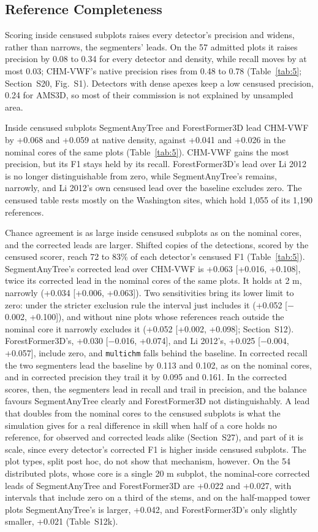 \documentclass[journal]{IEEEtran}
\begin{document}
\subsection{Reference Completeness}\label{sec:5.5}

Scoring inside censused subplots raises every detector's precision and widens,
rather than narrows, the segmenters' leads. On the 57 admitted plots it raises
precision by 0.08 to 0.34 for every detector and density, while recall moves by
at most 0.03; CHM-VWF's native precision rises from 0.48 to 0.78 (Table~\ref{tab:5};
Section~S20, Fig.~S1). Detectors with dense apexes keep a low censused
precision, 0.24 for AMS3D, so most of their commission is not explained by
unsampled area.

Inside censused subplots SegmentAnyTree and ForestFormer3D lead CHM-VWF by
+0.068 and +0.059 at native density, against +0.041 and +0.026 in the nominal
cores of the same plots (Table~\ref{tab:5}). CHM-VWF gains the most precision, but its F1
stays held by its recall. ForestFormer3D's lead over Li 2012 is no longer
distinguishable from zero, while SegmentAnyTree's remains, narrowly, and Li
2012's own censused lead over the baseline excludes zero. The censused table
rests mostly on the Washington sites, which hold 1,055 of its 1,190 references.

Chance agreement is as large inside censused subplots as on the nominal cores,
and the corrected leads are larger. Shifted copies of the detections, scored by
the censused scorer, reach 72 to 83\% of each detector's censused F1 (Table~\ref{tab:5}).
SegmentAnyTree's corrected lead over CHM-VWF is +0.063 [+0.016, +0.108], twice
its corrected lead in the nominal cores of the same plots. It holds at 2 m,
narrowly (+0.034 [+0.006, +0.063]). Two sensitivities bring its lower limit to
zero: under the stricter exclusion rule the interval just includes it (+0.052
[$-$0.002, +0.100]), and without nine plots whose references reach outside the
nominal core it narrowly excludes it (+0.052 [+0.002, +0.098]; Section~S12).
ForestFormer3D's, +0.030 [$-$0.016, +0.074], and Li 2012's, +0.025 [$-$0.004,
+0.057], include zero, and \texttt{multichm} falls behind the baseline. In corrected
recall the two segmenters lead the baseline by 0.113 and 0.102, as on the
nominal cores, and in corrected precision they trail it by 0.095 and 0.161. In
the corrected scores, then, the segmenters lead in recall and trail in
precision, and the balance favours SegmentAnyTree clearly and ForestFormer3D not
distinguishably. A lead that doubles from the nominal cores to the censused
subplots is what the simulation gives for a real difference in skill when half
of a core holds no reference, for observed and corrected leads alike (Section~S27), and part of it is scale, since every detector's corrected F1 is higher
inside censused subplots. The plot types, split post hoc, do not show that
mechanism, however. On the 54 distributed plots, whose core is a single 20 m
subplot, the nominal-core corrected leads of SegmentAnyTree and ForestFormer3D
are +0.022 and +0.027, with intervals that include zero on a third of the stems,
and on the half-mapped tower plots SegmentAnyTree's is larger, +0.042, and
ForestFormer3D's only slightly smaller, +0.021 (Table~S12k).
\end{document}
